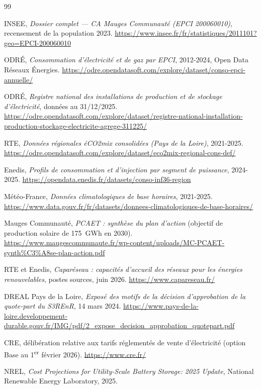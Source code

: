 \documentclass[11pt, a4paper]{report}
\begin{document}
\begin{thebibliography}{99}

INSEE, \textit{Dossier complet --- CA Mauges Communauté (EPCI 200060010)}, recensement de la population 2023. \url{https://www.insee.fr/fr/statistiques/2011101?geo=EPCI-200060010}

ODRÉ, \textit{Consommation d'électricité et de gaz par EPCI}, 2012-2024, Open Data Réseaux Énergies. \url{https://odre.opendatasoft.com/explore/dataset/conso-epci-annuelle/}

ODRÉ, \textit{Registre national des installations de production et de stockage d'électricité}, données au 31/12/2025. \url{https://odre.opendatasoft.com/explore/dataset/registre-national-installation-production-stockage-electricite-agrege-311225/}

RTE, \textit{Données régionales éCO2mix consolidées (Pays de la Loire)}, 2021-2025. \url{https://odre.opendatasoft.com/explore/dataset/eco2mix-regional-cons-def/}

Enedis, \textit{Profils de consommation et d'injection par segment de puissance}, 2024-2025. \url{https://opendata.enedis.fr/datasets/conso-inf36-region}

Météo-France, \textit{Données climatologiques de base horaires}, 2021-2025. \url{https://www.data.gouv.fr/fr/datasets/donnees-climatologiques-de-base-horaires/}

Mauges Communauté, \textit{PCAET : synthèse du plan d'action} (objectif de production solaire de 175~GWh en 2030). \url{https://www.maugescommunaute.fr/wp-content/uploads/MC-PCAET-synth\%C3\%A8se-plan-action.pdf}

RTE et Enedis, \textit{Caparéseau : capacités d'accueil des réseaux pour les énergies renouvelables}, postes sources, juin 2026. \url{https://www.capareseau.fr/}

DREAL Pays de la Loire, \textit{Exposé des motifs de la décision d'approbation de la quote-part du S3REnR}, 14 mars 2024. \url{https://www.pays-de-la-loire.developpement-durable.gouv.fr/IMG/pdf/2_expose_decision_approbation_quotepart.pdf}

CRE, délibération relative aux tarifs réglementés de vente d'électricité (option Base au 1\textsuperscript{er} février 2026). \url{https://www.cre.fr/}

NREL, \textit{Cost Projections for Utility-Scale Battery Storage: 2025 Update}, National Renewable Energy Laboratory, 2025.

\end{thebibliography}
\end{document}
